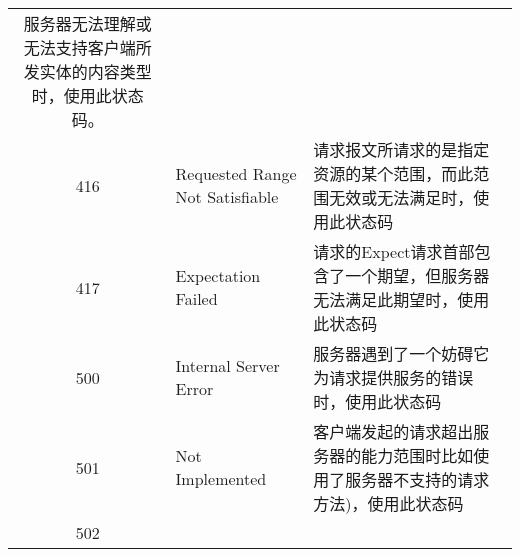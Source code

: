 \begin{longtable}[]{@{}cll@{}}
\begin{minipage}[t]{0.30\columnwidth}
服务器无法理解或无法支持客户端所发实体的内容类型时，使用此状态码。\strut
\end{minipage}\tabularnewline
\begin{minipage}[t]{0.32\columnwidth}\centering\strut
416\strut
\end{minipage} & \begin{minipage}[t]{0.30\columnwidth}\raggedright\strut
Requested Range Not Satisfiable\strut
\end{minipage} & \begin{minipage}[t]{0.30\columnwidth}\raggedright\strut
请求报文所请求的是指定资源的某个范围，而此范围无效或无法满足时，使用此状态码\strut
\end{minipage}\tabularnewline
\begin{minipage}[t]{0.32\columnwidth}\centering\strut
417\strut
\end{minipage} & \begin{minipage}[t]{0.30\columnwidth}\raggedright\strut
Expectation Failed\strut
\end{minipage} & \begin{minipage}[t]{0.30\columnwidth}\raggedright\strut
请求的Expect请求首部包含了一个期望，但服务器无法满足此期望时，使用此状态码\strut
\end{minipage}\tabularnewline
\begin{minipage}[t]{0.32\columnwidth}\centering\strut
500\strut
\end{minipage} & \begin{minipage}[t]{0.30\columnwidth}\raggedright\strut
Internal Server Error\strut
\end{minipage} & \begin{minipage}[t]{0.30\columnwidth}\raggedright\strut
服务器遇到了一个妨碍它为请求提供服务的错误时，使用此状态码\strut
\end{minipage}\tabularnewline
\begin{minipage}[t]{0.32\columnwidth}\centering\strut
501\strut
\end{minipage} & \begin{minipage}[t]{0.30\columnwidth}\raggedright\strut
Not Implemented\strut
\end{minipage} & \begin{minipage}[t]{0.30\columnwidth}\raggedright\strut
客户端发起的请求超出服务器的能力范围时比如使用了服务器不支持的请求方法)，使用此状态码\strut
\end{minipage}\tabularnewline
\begin{minipage}[t]{0.32\columnwidth}\centering\strut
502\strut

\end{minipage}
\end{longtable}
